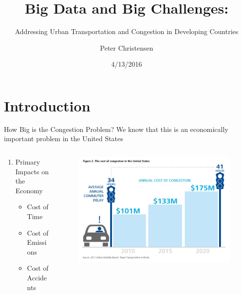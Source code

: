 \documentclass[newPxFont]{beamer}
\title{Big Data and Big Challenges:}
\subtitle{Addressing Urban Transportation and Congestion in Developing Countries}
\date{4/13/2016}
\author{Peter Christensen}
\institute{University of Illinois}
\begin{document}
%
%

\maketitle


%
%

\section*{Introduction}



\begin{frame}[c]{How Big is the Congestion Problem?}
	We know that this is an economically important problem in the United States
	\begin{columns}
		\begin{column}{.5\linewidth}
			\begin{enumerate}   
				\item{Primary Impacts on the Economy}
				\begin{itemize}  
					\item{Cost of Time}
					\item{Cost of Emissions}
					\item{Cost of Accidents}
				\end{itemize}  
			\end{enumerate}
		\end{column}
		\begin{column}{.49\linewidth}
			\begin{figure}
				\centering
				\includegraphics[width=1.1\linewidth]{USCongestion.jpg}
			\end{figure}
		\end{column}
	\end{columns}
\end{frame}
\end{document}
